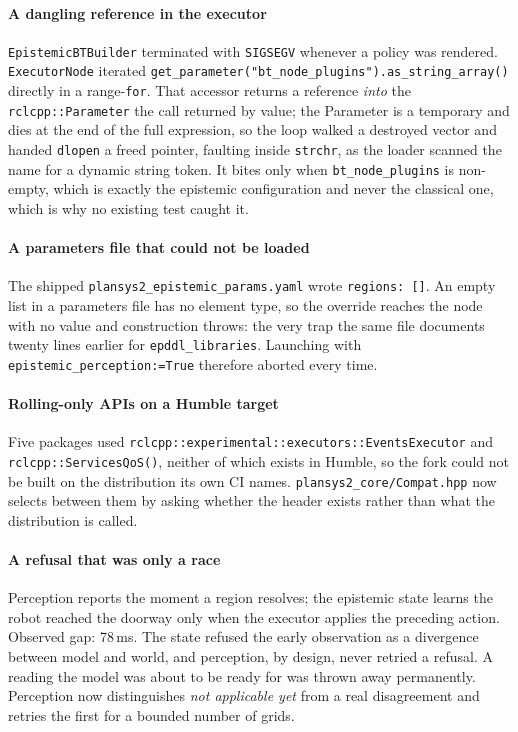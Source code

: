 \documentclass[11pt,a4paper]{article}
\theoremstyle{definition}
\newcommand{\code}[1]{\texttt{\small #1}}
\begin{document}
\begin{sloppypar}
\paragraph{A dangling reference in the executor} \code{EpistemicBTBuilder}
terminated with \code{SIGSEGV} whenever a policy was rendered.
\code{ExecutorNode} iterated
\code{get\_parameter("bt\_node\_plugins").as\_string\_array()} directly in a
range-\code{for}. That accessor returns a reference \emph{into} the
\code{rclcpp::Parameter} the call returned by value; the Parameter is a
temporary and dies at the end of the full expression, so the loop walked a
destroyed vector and handed \code{dlopen} a freed pointer, faulting inside
\code{strchr}, as the loader scanned the name for a dynamic string token. It
bites only when \code{bt\_node\_plugins} is non-empty, which is exactly the
epistemic configuration and never the classical one, which is why no existing
test caught it.
\end{sloppypar}

\paragraph{A parameters file that could not be loaded} The shipped
\code{plansys2\_epistemic\_params.yaml} wrote \code{regions: []}. An empty list
in a parameters file has no element type, so the override reaches the node with
no value and construction throws: the very trap the same file documents
twenty lines earlier for \code{epddl\_libraries}. Launching with
\code{epistemic\_perception:=True} therefore aborted every time.

\begin{sloppypar}
\paragraph{Rolling-only APIs on a Humble target} Five packages used
\code{rclcpp::experimental::executors::EventsExecutor} and
\code{rclcpp::ServicesQoS()}, neither of which exists in Humble, so the fork
could not be built on the distribution its own CI names.
\code{plansys2\_core/Compat.hpp} now selects between them by asking whether the
header exists rather than what the distribution is called.
\end{sloppypar}

\paragraph{A refusal that was only a race} Perception reports the moment a
region resolves; the epistemic state learns the robot reached the doorway only
when the executor applies the preceding action. Observed gap: 78\,ms. The state
refused the early observation as a divergence between model and world, and
perception, by design, never retried a refusal. A reading the model was
about to be ready for was thrown away permanently. Perception now distinguishes
\emph{not applicable yet} from a real disagreement and retries the first for a
bounded number of grids.
\end{document}
